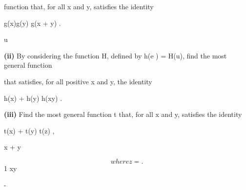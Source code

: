 \documentclass[12pt]{article}
\begin{document}
\begin{flushleft}
function that, for all x and y, satisfies the identity\par
g(x)g(y) g(x + y) .\par
\equiv\par
u\par
\textbf{(ii)} By considering the function H, defined by h(e ) = H(u), find the most general function\par
that satisfies, for all positive x and y, the identity\par
h(x) + h(y) h(xy) .\par
\equiv\par
\textbf{(iii)} Find the most general function t that, for all x and y, satisfies the identity\par
t(x) + t(y) t(z) ,\par
\equiv\par
x + y\par
\[where z = .\]
1 xy\par
-\par
\end{flushleft}
\end{document}

